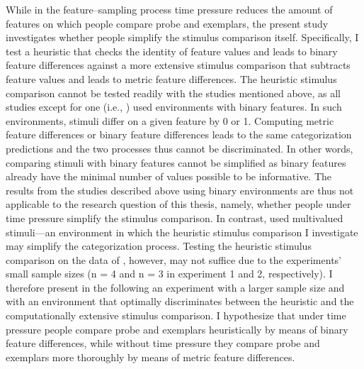 \documentclass[a4paper,man,natbib]{apa6}
\begin{document}
While in the feature--sampling process time pressure reduces the amount of features on which people compare probe and exemplars, the present study investigates whether people simplify the stimulus comparison itself. Specifically, I test a heuristic that checks the identity of feature values and leads to binary feature differences against a more extensive stimulus comparison that subtracts feature values and leads to metric feature differences. The heuristic stimulus comparison cannot be tested readily with the studies mentioned above, as all studies except for one (i.e., \citealp{lamberts1997fast}) used environments with binary features. In such environments, stimuli differ on a given feature by 0 or 1. Computing metric feature differences or binary feature differences leads to the same categorization predictions and the two processes thus cannot be discriminated. In other words, comparing stimuli with binary features cannot be simplified as binary features already have the minimal number of values possible to be informative. The results from the studies described above using binary environments \citep{lamberts1995categorization, lamberts1998time, lamberts1999building, lamberts1999categorization} are thus not applicable to the research question of this thesis, namely, whether people under time pressure simplify the stimulus comparison. In contrast, \cite{lamberts1997fast} used multivalued stimuli---an environment in which the heuristic stimulus comparison I investigate may simplify the categorization process. Testing the heuristic stimulus comparison on the data of \citeauthor{lamberts1997fast}, however, may not suffice due to the experiments' small sample sizes (n = 4 and n = 3 in experiment 1 and 2, respectively). I therefore present in the following an experiment with a larger sample size and with an environment that optimally discriminates between the heuristic and the computationally extensive stimulus comparison. I hypothesize that under time pressure people compare probe and exemplars heuristically by means of binary feature differences, while without time pressure they compare probe and exemplars more thoroughly by means of metric feature differences. 
\end{document}
